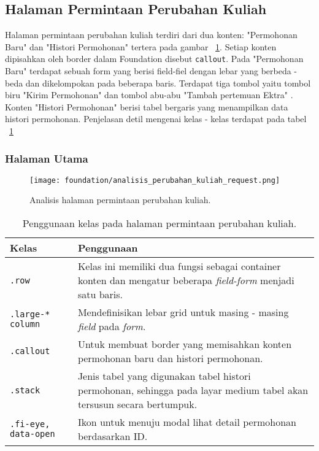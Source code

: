 \subsection{Halaman Permintaan Perubahan Kuliah}
Halaman permintaan perubahan kuliah terdiri dari dua konten: "Permohonan Baru" dan "Histori Permohonan" tertera pada gambar ~\ref{fig:analisisPermintaanPerubahanKuliah}. Setiap konten dipisahkan oleh border dalam Foundation disebut \texttt{callout}. Pada "Permohonan Baru" terdapat sebuah form yang berisi field-fiel dengan lebar yang berbeda - beda dan dikelompokan pada beberapa baris. Terdapat tiga tombol yaitu tombol biru "Kirim Permohonan" dan tombol abu-abu "Tambah pertemuan Ektra" .
Konten "Histori Permohonan" berisi tabel bergaris yang menampilkan data histori permohonan. Penjelasan detil mengenai kelas - kelas terdapat pada tabel ~\ref{table:analisisPermintaanPerubahanKuliah} 

\subsubsection{Halaman Utama}
\begin{figure} [H]
	\centering  
	\texttt{[image: foundation/analisis\_perubahan\_kuliah\_request.png]}
	\caption{Analisis halaman permintaan perubahan kuliah.}
	\label{fig:analisisPermintaanPerubahanKuliah}
\end{figure}
\begin{table}[H]
	\centering
	\caption{Penggunaan kelas pada halaman permintaan perubahan kuliah.}
	\begin{tabularx}{\textwidth}{lX}
		\toprule
		Kelas     & Penggunaan \\
		\midrule
		 \texttt{.row} & Kelas ini memiliki dua fungsi sebagai container konten dan mengatur beberapa \textit{field-form} menjadi satu baris. \\
		 \texttt{.large-* column} & Mendefinisikan lebar grid untuk masing - masing \textit{field} pada \textit{form}. \\
		 \texttt{.callout} & Untuk membuat border yang memisahkan konten permohonan baru dan histori permohonan.\\
		 \texttt{.stack} & Jenis tabel yang digunakan tabel histori permohonan, sehingga pada layar medium tabel akan tersusun secara bertumpuk.\\
		 \texttt{.fi-eye, data-open} & Ikon untuk menuju modal lihat detail permohonan berdasarkan ID.\\
		\bottomrule
	\end{tabularx}%
	\label{table:analisisPermintaanPerubahanKuliah}
\end{table}

